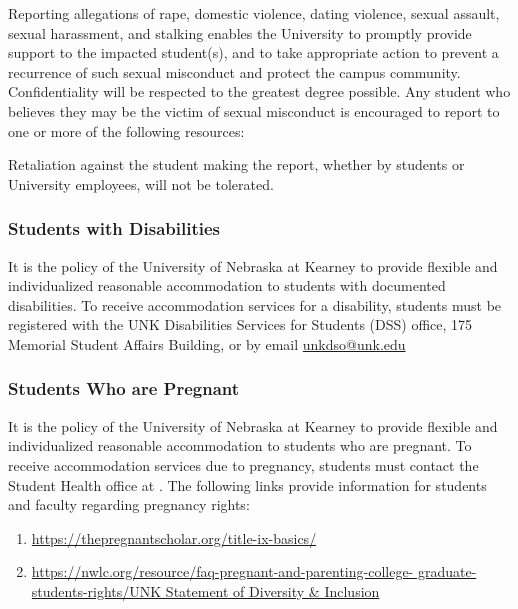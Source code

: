 \documentclass[12pt]{article}
\newcounter{on}\setcounter{on}{0}
\newcounter{ex}\setcounter{ex}{0}
\renewenvironment{description}[0]{\begin{compactdesc}}{\end{compactdesc}}
\begin{document}
Reporting allegations of rape, domestic violence, dating violence, sexual assault, sexual harassment, and stalking enables the University to promptly provide support to the impacted student(s), and to take appropriate action to prevent a recurrence of such sexual misconduct and protect the campus community. Confidentiality will be respected to the greatest degree possible. Any student who believes they may be the victim of sexual misconduct is encouraged to report to one or more of the following resources:
\begin{description}
    \item[Local Domestic Violence, Sexual Assault Advocacy Agency]

    \item[Campus Police (or Security)]
    
    \item[Title IX Coordinator]

\end{description}
Retaliation against the student making the report, whether by students or University employees, will not be tolerated.

\subsubsection*{Students with Disabilities}

It is the policy of the University of Nebraska at Kearney to provide flexible and individualized reasonable accommodation to students with documented disabilities. To receive accommodation services for a disability, students must be registered with the UNK Disabilities Services for Students (DSS) office, 175 Memorial Student 
Affairs Building,   or by 
email \href{mailto:unkdso@unk.edu}{unkdso@unk.edu}

\subsubsection*{Students Who are Pregnant}

It is the policy of the University of Nebraska at Kearney to provide flexible 
and individualized reasonable accommodation to students who are pregnant. 
To receive accommodation services due to pregnancy, students must contact 
the Student Health office at . The following 
links provide information for students and faculty regarding pregnancy 
rights:
\small
\begin{enumerate}
  \item \url{https://thepregnantscholar.org/title-ix-basics/}
  \item \url{https://nwlc.org/resource/faq-pregnant-and-parenting-college-
  graduate-students-rights/UNK Statement of Diversity & Inclusion}
\end{enumerate}
\normalsize
\end{document}
